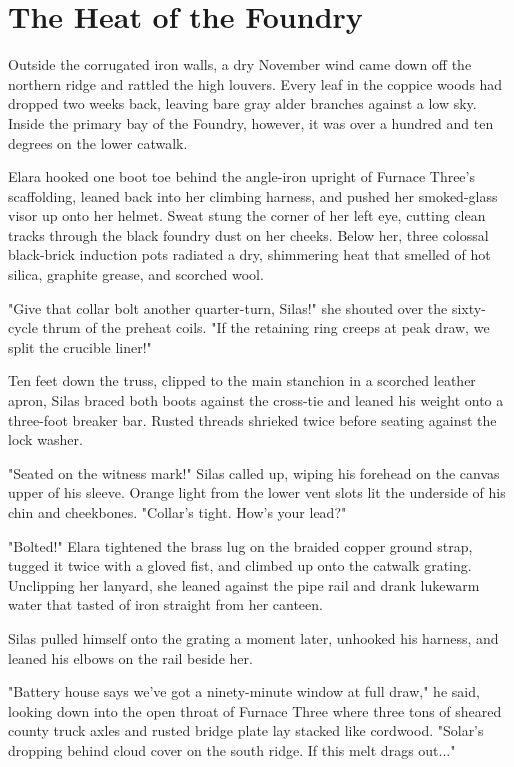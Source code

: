 \chapter{The Heat of the Foundry}

Outside the corrugated iron walls, a dry November wind came down off the northern ridge and rattled the high louvers. Every leaf in the coppice woods had dropped two weeks back, leaving bare gray alder branches against a low sky. Inside the primary bay of the Foundry, however, it was over a hundred and ten degrees on the lower catwalk.

Elara hooked one boot toe behind the angle-iron upright of Furnace Three's scaffolding, leaned back into her climbing harness, and pushed her smoked-glass visor up onto her helmet. Sweat stung the corner of her left eye, cutting clean tracks through the black foundry dust on her cheeks. Below her, three colossal black-brick induction pots radiated a dry, shimmering heat that smelled of hot silica, graphite grease, and scorched wool.

"Give that collar bolt another quarter-turn, Silas!" she shouted over the sixty-cycle thrum of the preheat coils. "If the retaining ring creeps at peak draw, we split the crucible liner!"

Ten feet down the truss, clipped to the main stanchion in a scorched leather apron, Silas braced both boots against the cross-tie and leaned his weight onto a three-foot breaker bar. Rusted threads shrieked twice before seating against the lock washer.

"Seated on the witness mark!" Silas called up, wiping his forehead on the canvas upper of his sleeve. Orange light from the lower vent slots lit the underside of his chin and cheekbones. "Collar's tight. How's your lead?"

"Bolted!" Elara tightened the brass lug on the braided copper ground strap, tugged it twice with a gloved fist, and climbed up onto the catwalk grating. Unclipping her lanyard, she leaned against the pipe rail and drank lukewarm water that tasted of iron straight from her canteen.

Silas pulled himself onto the grating a moment later, unhooked his harness, and leaned his elbows on the rail beside her.

"Battery house says we've got a ninety-minute window at full draw," he said, looking down into the open throat of Furnace Three where three tons of sheared county truck axles and rusted bridge plate lay stacked like cordwood. "Solar's dropping behind cloud cover on the south ridge. If this melt drags out..."

